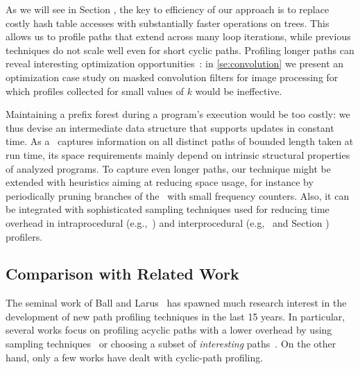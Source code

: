 As we will see in Section \missing, the key to efficiency of our approach is to replace costly hash table accesses with substantially faster operations on trees. This allows us to profile paths that extend across many loop iterations, while previous techniques do not scale well even for short cyclic paths. Profiling longer paths can reveal interesting optimization opportunities~\cite{Delia13}: in \mysection\ref{se:convolution} we present an optimization case study on masked convolution filters for image processing for which profiles collected for small values of $k$ would be ineffective.

Maintaining a prefix forest during a program's execution would be too costly: we thus devise an intermediate data structure that supports updates in constant time. As a \ksf\ captures information on all distinct paths of bounded length taken at run time, its space requirements mainly depend on intrinsic structural properties of analyzed programs. To capture even longer paths, our technique might be extended with heuristics aiming at reducing space usage, for instance by periodically pruning branches of the \ksf\ with small frequency counters. Also, it can be integrated with sophisticated sampling techniques used for reducing time overhead in intraprocedural (e.g.,~\cite{Bond05}) and interprocedural (e.g,~\cite{Zhuang06} and Section \missing) profilers.





\subsection{Comparison with Related Work}

The seminal work of Ball and Larus~\cite{Ball96} has spawned much research interest in the development of new path profiling techniques in the last 15 years. In particular, several works focus on profiling acyclic paths with a lower overhead by using sampling techniques~\cite{Bond05,Bond05b} or choosing a subset of {\em interesting} paths~\cite{Apiwattanapong02,Joshi04,Vaswani07}.
On the other hand, only a few works have dealt with cyclic-path profiling.

